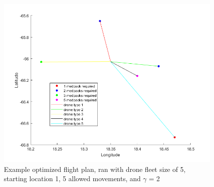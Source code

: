 \documentclass[twocolumn,10pt]{asme2ej}
\begin{document}
\begin{figure}
	\centering
	\includegraphics[width=1\linewidth]{../example_flight_plan}
	\caption[Fig 1.]{Example optimized flight plan, ran with drone fleet size of 5, starting location 1, 5 allowed movements, and $\gamma$ = 2}
	\label{Fig 1.}
\end{figure}
\end{document}
